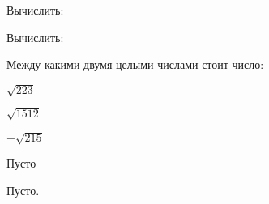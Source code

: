 \begin{class}[number=3]
\begin{listofex}
\begin{enumcols}[itemcolumns=2]
		\end{enumcols}
		\item Вычислить:
		\begin{enumcols}[itemcolumns=3]
			\item {}
			\item {}
			\item {}
			\item {}
			\item {}
			\item {}
		\end{enumcols}
		\item Вычислить:
		\begin{enumcols}[itemcolumns=3]
			\item {}
			\item {}
			\item {}
			\item {}
			\item {}
			\item {}
			\item {}
		\end{enumcols}
		\item Между какими двумя целыми числами стоит число:
		\begin{enumcols}[itemcolumns=3]
			\item \( \sqrt{223} \)
			\item \( \sqrt{1512} \)
			\item \( -\sqrt{215} \)
		\end{enumcols}
	\end{listofex}
\end{class}
%
%
\begin{class}[number=4]
	\begin{listofex}
		\item Пусто
	\end{listofex}
\end{class}
%
%
\begin{homework}[number=2]
	\begin{listofex}
		\item Пусто.
	\end{listofex}
\end{homework}
